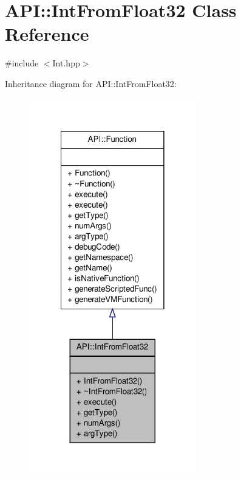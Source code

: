 \hypertarget{class_a_p_i_1_1_int_from_float32}{\section{A\-P\-I\-:\-:Int\-From\-Float32 Class Reference}
\label{class_a_p_i_1_1_int_from_float32}
}


{\ttfamily \#include $<$Int.\-hpp$>$}



Inheritance diagram for A\-P\-I\-:\-:Int\-From\-Float32\-:
\nopagebreak
\begin{figure}[H]
\begin{center}
\leavevmode
\includegraphics[width=206pt]{class_a_p_i_1_1_int_from_float32__inherit__graph}
\end{center}
\end{figure}


